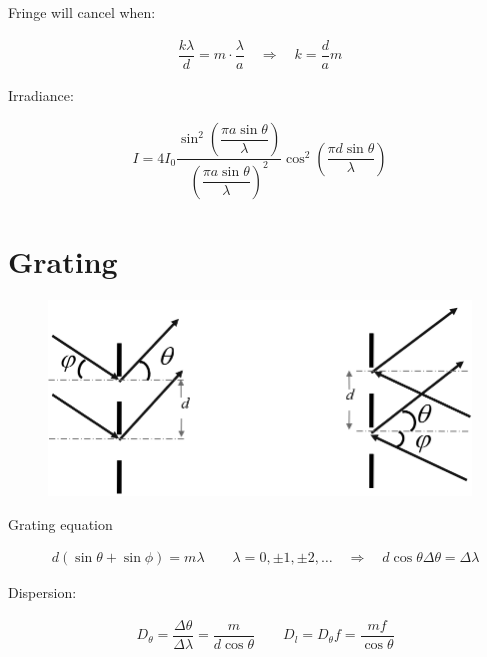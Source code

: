 Fringe will cancel when:

\begin{equation*}
  \begin{aligned}
    \dfrac{k \lambda}{d} = m \cdot \dfrac{\lambda}{a} \quad \Rightarrow \quad k = \dfrac{d}{a} m  
  \end{aligned}
\end{equation*}

Irradiance:

\begin{equation*}
  \begin{aligned}
    I = 4 I_0 \dfrac{\sin^2 \left( \dfrac{\pi a \sin \theta}{\lambda} \right)}{\left( \dfrac{\pi a \sin \theta}{\lambda}  \right)^2} \cos^2 \left( \dfrac{\pi d \sin \theta }{\lambda}  \right)
  \end{aligned}
\end{equation*}

\section{Grating}

\begin{figure}[H]
  \centering
  \includegraphics[width=0.5\linewidth]{figures/grating.png}
\end{figure}

Grating equation

\begin{equation*}
  \begin{aligned}
    & d \left( \sin \theta + \sin \phi \right) = m \lambda
    \quad\quad
    \lambda = 0, \pm 1, \pm 2, \dots
    \quad \Rightarrow \quad 
    d \cos \theta \Delta \theta = \Delta \lambda
  \end{aligned}
\end{equation*}

Dispersion:

\begin{equation*}
  \begin{aligned}
    & D_{\theta} = \dfrac{\Delta \theta}{\Delta \lambda} = \dfrac{m}{d \cos \theta}
    \quad\quad 
    D_l = D_{\theta} f = \dfrac{m f}{\cos \theta} 
  \end{aligned}
\end{equation*}

